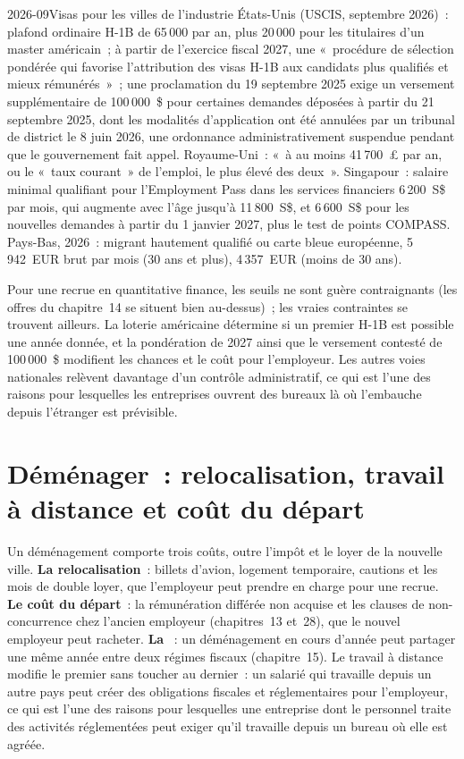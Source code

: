 \begin{dated}{2026-09}{Visas pour les villes de l'industrie}\label{dat:in:locations:visas}
États-Unis (USCIS, septembre 2026)~: plafond ordinaire H-1B de 65\,000 par an, plus 20\,000 pour les titulaires d'un master américain~;
à partir de l'exercice fiscal 2027, une «~procédure de sélection pondérée qui favorise l'attribution des visas H-1B aux candidats
plus qualifiés et mieux rémunérés~»~; une proclamation du 19 septembre 2025 exige un versement supplémentaire de 100\,000~\$ pour certaines
demandes déposées à partir du 21 septembre 2025, dont les modalités d'application ont été annulées par un tribunal de district le 8 juin 2026, une ordonnance
administrativement suspendue pendant que le gouvernement fait appel. Royaume-Uni~:  «~à au moins 41\,700~\pounds
par an, ou le «~taux courant~» de l'emploi, le plus élevé des deux~». Singapour~: salaire minimal qualifiant pour l'Employment Pass dans les
services financiers 6\,200~S\$ par mois, qui augmente avec l'âge jusqu'à 11\,800~S\$, et 6\,600~S\$ pour les nouvelles demandes à partir du 1 janvier
2027, plus le test de points COMPASS. Pays-Bas, 2026~: migrant hautement qualifié ou carte bleue européenne, 5\,942~EUR brut par mois
(30 ans et plus), 4\,357~EUR (moins de 30 ans).
\end{dated}

Pour une recrue en quantitative finance, les seuils ne sont guère contraignants (les offres du chapitre~14 se situent bien au-dessus)~; les vraies contraintes se trouvent
ailleurs. La loterie américaine détermine si un premier H-1B est possible une année donnée, et la pondération de 2027 ainsi que
le versement contesté de 100\,000~\$ modifient les chances et le coût pour l'employeur. Les autres voies nationales relèvent davantage
d'un contrôle administratif, ce qui est l'une des raisons pour lesquelles les entreprises ouvrent des bureaux là où l'embauche depuis l'étranger est prévisible.

\section{Déménager~: relocalisation, travail à distance et coût du départ}

Un déménagement comporte trois coûts, outre l'impôt et le loyer de la nouvelle ville. \textbf{La relocalisation}~: billets d'avion, logement temporaire, cautions et
les mois de double loyer, que l'employeur peut prendre en charge pour une recrue. \textbf{Le coût du départ}~: la rémunération différée non acquise et les clauses de
non-concurrence chez l'ancien employeur (chapitres~13 et~28), que le nouvel employeur peut racheter. \textbf{La
}~: un déménagement en cours d'année peut partager une même année entre deux régimes fiscaux (chapitre~15). Le travail à distance modifie le premier sans toucher au dernier~: un salarié qui travaille depuis un autre pays
peut créer des obligations fiscales et réglementaires pour l'employeur, ce qui est l'une des raisons pour lesquelles une entreprise dont le personnel traite des activités réglementées
peut exiger qu'il travaille depuis un bureau où elle est agréée.

